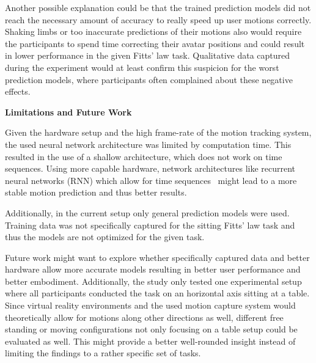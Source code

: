 \documentclass[sigconf]{acmart}
\begin{document}
Another possible explanation could be that the trained prediction models did not reach the necessary amount of accuracy to really speed up user motions correctly. Shaking limbs or too inaccurate predictions of their motions also would require the participants to spend time correcting their avatar positions and could result in lower performance in the given Fitts' law task. Qualitative data captured during the experiment would at least confirm this suspicion for the worst prediction models, where participants often complained about these negative effects. 

\textbf{Limitations and Future Work}

Given the hardware setup and the high frame-rate of the motion tracking system, the used neural network architecture was limited by computation time. This resulted in the use of a shallow architecture, which does not work on time sequences. Using more capable hardware, network architectures like recurrent neural networks (RNN) which allow for time sequences~\cite{Martinez2017} might lead to a more stable motion prediction and thus better results.

Additionally, in the current setup only general prediction models were used. Training data was not specifically captured for the sitting Fitts' law task and thus the models are not optimized for the given task.

Future work might want to explore whether specifically captured data and better hardware allow more accurate models resulting in better user performance and better embodiment. Additionally, the study only tested one experimental setup where all participants conducted the task on an horizontal axis sitting at a table. Since virtual reality environments and the used motion capture system would theoretically allow for motions along other directions as well, different free standing or moving configurations not only focusing on a table setup could be evaluated as well. This might provide a better well-rounded insight instead of limiting the findings to a rather specific set of tasks.



\end{document}
